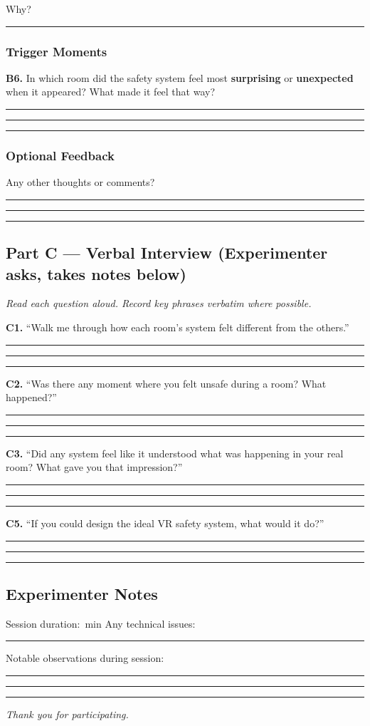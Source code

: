 \documentclass{styling/vgtc} %
\newcommand{\answerlines}{%
  \par\vspace{4pt}%
  \noindent\rule{\linewidth}{0.3pt}\par\vspace{10pt}%
  \noindent\rule{\linewidth}{0.3pt}\par\vspace{10pt}%
  \noindent\rule{\linewidth}{0.3pt}\par\vspace{6pt}}
\begin{document}
\smallskip
\noindent Why?\enspace\rule{0.85\linewidth}{0.3pt}

\subsubsection*{Trigger Moments}

\noindent\textbf{B6.} In which room did the safety system feel most \textbf{surprising} or \textbf{unexpected} when it appeared? What made it feel that way?\answerlines

\subsubsection*{Optional Feedback}

\noindent Any other thoughts or comments?\answerlines

\bigskip
\subsection*{Part C --- Verbal Interview \textnormal{\small(Experimenter asks, takes notes below)}}

\noindent\textit{Read each question aloud. Record key phrases verbatim where possible.}

\medskip
\noindent\textbf{C1.} ``Walk me through how each room's system felt different from the others.''\answerlines

\noindent\textbf{C2.} ``Was there any moment where you felt unsafe during a room? What happened?''\answerlines

\noindent\textbf{C3.} ``Did any system feel like it understood what was happening in your real room? What gave you that impression?''\answerlines

\noindent\textbf{C5.} ``If you could design the ideal VR safety system, what would it do?''\answerlines

\bigskip
\subsection*{Experimenter Notes}

\noindent Session duration:\;\underline{\hspace{2cm}}~min\qquad
Any technical issues:\;\rule{0.6\linewidth}{0.3pt}

\smallskip
\noindent Notable observations during session:\answerlines

\bigskip
\begin{center}\textit{Thank you for participating.}\end{center}
\end{document}
